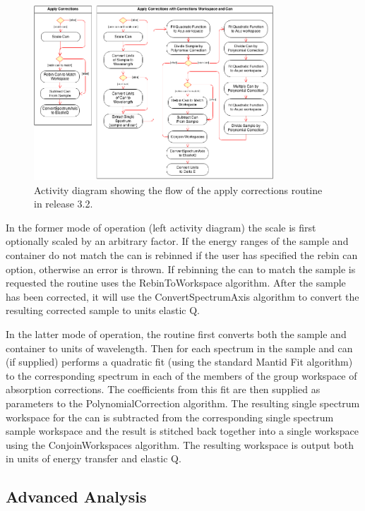 \documentclass[paper=a4, fontsize=11pt]{scrartcl}	%
\numberwithin{equation}{section}															%
\numberwithin{figure}{section}																%
\numberwithin{table}{section}																%
\begin{document}
\begin{figure}[H]
\centering
\includegraphics[width=0.8\textwidth]{img/uml/activity_diagrams/ApplyCorr_activity.png}
\caption{Activity diagram showing the flow of the apply corrections routine in release 3.2.}
\label{fig:applycorr-activity-diagram}
\end{figure}

In the former mode of operation (left activity diagram) the scale is first optionally scaled by an arbitrary factor. If the energy ranges of the sample and container do not match the can is rebinned if the user has specified the rebin can option, otherwise an error is thrown. If rebinning the can to match the sample is requested the routine uses the RebinToWorkspace algorithm. After the sample has been corrected, it will use the ConvertSpectrumAxis algorithm to convert the resulting corrected sample to units elastic Q.

In the latter mode of operation, the routine first converts both the sample and container to units of wavelength. Then for each spectrum in the sample and can (if supplied) performs a quadratic fit (using the standard Mantid Fit algorithm) to the corresponding spectrum in each of the members of the group workspace of absorption corrections. The coefficients from this fit are then supplied as parameters to the PolynomialCorrection algorithm. The resulting single spectrum workspace for the can is subtracted from the corresponding single spectrum sample workspace and the result is stitched back together into a single workspace using the ConjoinWorkspaces algorithm. The resulting workspace is output both in units of energy transfer and elastic Q.


\subsection{Advanced Analysis}
\end{document}
